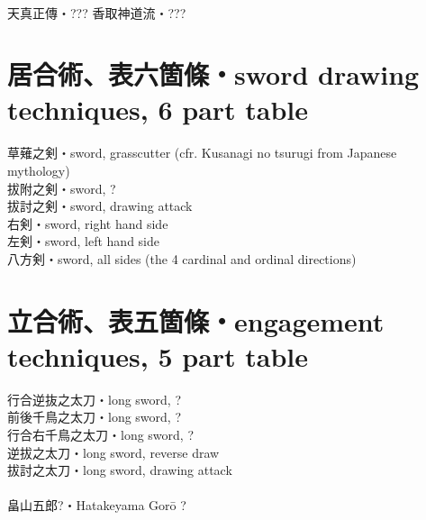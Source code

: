 \documentclass[dvipdfmx, a4paper, 12pt]{utarticle}
\begin{document}
\begin{CJK*}{UTF8}{min}
\begin{landscape}
\setcounter{section}{0}
\newpage
\pagestyle{empty}
\section{}
\noindent {}\\
\\
\\
\\
\\
\\
\section{}
\noindent {}\\
\\
\\
\\
\\
\\

\setcounter{section}{0}
\newpage
\pagestyle{empty}
天真正傳・???
香取神道流・???
\section{居合術、表六箇條・sword drawing techniques, 6 part table}
\noindent 草薙之剣・sword, grasscutter (cfr. Kusanagi no tsurugi from Japanese mythology)\\
拔附之剣・sword, ?\\
拔討之剣・sword, drawing attack\\
右剣・sword, right hand side\\
左剣・sword, left hand side\\
八方剣・sword, all sides (the 4 cardinal and ordinal directions)\\
\section{立合術、表五箇條・engagement techniques, 5 part table}
\noindent 行合逆抜之太刀・long sword, ?\\
前後千鳥之太刀・long sword, ?\\
行合右千鳥之太刀・long sword, ?\\
逆拔之太刀・long sword, reverse draw\\
拔討之太刀・long sword, drawing attack\\
\\
畠山五郎?・Hatakeyama Gor\={o} ?



\end{landscape}
\end{CJK*}
\end{document}

